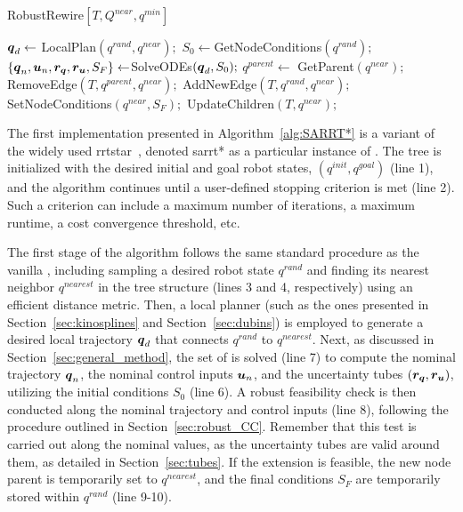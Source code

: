 \begin{algorithm}[t]
    \caption{RobustRewire$[T, Q^{near}, q^{min}]$}\label{alg:RobustRewire}
    \begin{algorithmic}[1]
            \State $\boldsymbol{q}_d \gets$ LocalPlan$(q^{rand}, q^{near});$
            \State $S_0 \gets $GetNodeConditions$({q^{rand}});$
            \State $\left \{\boldsymbol{q}_n, \boldsymbol{u}_n, \boldsymbol{r_q}, \boldsymbol{r_u}, S_F \right \}  \gets $SolveODEs$(\boldsymbol{q}_d, S_0);$
                    \State $q^{parent} \gets$ GetParent$(q^{near});$
                    \State RemoveEdge$(T, q^{parent}, q^{near});$
                    \State AddNewEdge$(T, q^{rand}, q^{near});$
                    \State SetNodeConditions$(q^{near}, S_{F});$
                    \State UpdateChildren$(T, q^{near});$
                \EndIf
            \EndIf
        \EndFor
    \end{algorithmic}
\end{algorithm}

The first implementation presented in Algorithm~\ref{alg:SARRT*} is a variant of the widely used \gls{rrtstar}~\cite{cRRTstar}, denoted \gls{sarrt*} as a particular instance of .
The tree is initialized with the desired initial and goal robot states, $(q^{init}, q^{goal})$ (line 1), and the algorithm continues until a user-defined stopping criterion is met (line 2).
Such a criterion can include a maximum number of iterations, a maximum runtime, a cost convergence threshold, etc.

The first stage of the algorithm follows the same standard procedure as the vanilla , including sampling a desired robot state $q^{rand}$ and finding its nearest neighbor $q^{nearest}$ in the tree structure (lines 3 and 4, respectively) using an efficient distance metric.
Then, a local planner (such as the ones presented in Section~\ref{sec:kinosplines} and Section~\ref{sec:dubins}) is employed to generate a desired local trajectory $\boldsymbol{q}_d$ that connects $q^{rand}$ to $q^{nearest}$.
Next, as discussed in Section~\ref{sec:general_method}, the set of  is solved (line 7) to compute the nominal trajectory $\boldsymbol{q}_n$, the nominal control inputs $\boldsymbol{u}_n$, and the uncertainty tubes $(\boldsymbol{r_q}, \boldsymbol{r_u})$, utilizing the initial conditions $S_0$ (line 6).
A robust feasibility check is then conducted along the nominal trajectory and control inputs (line 8), following the procedure outlined in Section~\ref{sec:robust_CC}.
Remember that this test is carried out along the nominal values, as the uncertainty tubes are valid around them, as detailed in Section~\ref{sec:tubes}.
If the extension is feasible, the new node parent is temporarily set to $q^{nearest}$, and the final conditions $S_F$ are temporarily stored within $q^{rand}$ (line 9-10).

